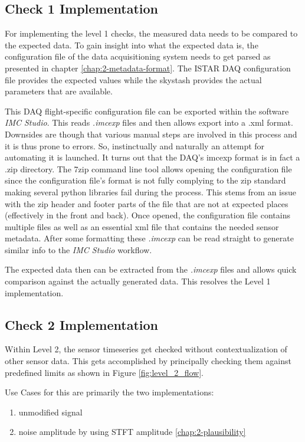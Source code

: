 \subsection{Check 1 Implementation}

For implementing the level 1 checks, the measured data needs to be compared to the expected data. To gain insight into what the expected data is, the configuration file of the data acquisitioning system needs to get parsed as presented in chapter \ref{chap:2-metadata-format}. The ISTAR DAQ configuration file provides the expected values while the skystash provides the actual parameters that are available.

This DAQ flight-specific configuration file can be exported within the software \textit{IMC Studio}. This reads \textit{.imcexp} files and then allows export into a .xml format. Downsides are though that various manual steps are involved in this process and it is thus prone to errors. So, instinctually and naturally an attempt for automating it is launched. It turns out that the DAQ's imcexp format is in fact a .zip directory. The 7zip command line tool allows opening the configuration file since the configuration file's format is not fully complying to the zip standard making several python libraries fail during the process. This stems from an issue with the zip header and footer parts of the file that are not at expected places (effectively in the front and back). Once opened, the configuration file contains multiple files as well as an essential xml file that contains the needed sensor metadata. After some formatting these \textit{.imcexp} can be read straight to generate similar info to the \textit{IMC Studio} workflow.

The expected data then can be extracted from the \textit{.imcexp} files and allows quick comparison against the actually generated data. This resolves the Level 1 implementation.

\subsection{Check 2 Implementation}

Within Level 2, the sensor timeseries get checked without contextualization of other sensor data. This gets accomplished by principally checking them against predefined limits as shown in Figure \ref{fig:level_2_flow}.

Use Cases for this are primarily the two implementations:

\begin{enumerate}
    \item unmodified signal
    \item noise amplitude by using STFT amplitude \ref{chap:2-plausibility}
\end{enumerate}

